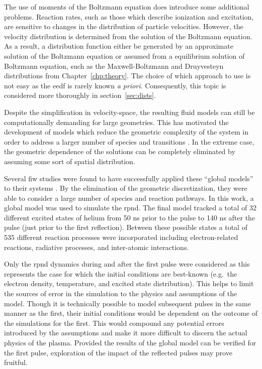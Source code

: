 The use of moments of the Boltzmann equation does introduce some additional
problems. Reaction rates, such as those which describe ionization and
excitation, are sensitive to changes in the distribution of particle velocities.
However, the velocity distribution is determined from the solution of the
Boltzmann equation. As a result, a distribution function either be generated by
an approximate solution of the Boltzmann equation \cite{Hagelaar2005} or assumed
from a equilibrium solution of Boltzmann equation, such as the Maxwell-Boltzmann
and Druyvesteyn distributions from Chapter~\ref{chp:theory}. The choice of which
approach to use is not easy as the \acs{eedf} is rarely known \emph{a priori}.
Consequently, this topic is considered more thoroughly in
section~\ref{sec:dists}.

Despite the simplification in velocity-space, the resulting fluid models can
still be computationally demanding for large geometries. This has motivated the
development of models which reduce the geometric complexity of the system in
order to address a larger number of species and transitions
\cite{Lieberman2005}. In the extreme case, the geometric dependence of the
solutions can be completely eliminated by assuming some sort of spatial
distribution.

Several \acs{fiw} studies were found to have successfully applied these ``global
models'' to their systems \cite{Aleksandrov2007, Popov2011}. By the elimination
of the geometric discretization, they were able to consider a large number of
species and reaction pathways. In this work, a global model was used to simulate
the \acs{rpnd}. The final model tracked a total of 32 different excited states
of helium from 50 ns prior to the pulse to 140 ns after the pulse (just prior to
the first reflection). Between these possible states a total of 535 different
reaction processes were incorporated including electron-related reactions,
radiative processes, and inter-atomic interactions.

Only the \acs{rpnd} dynamics during and after the first pulse were considered as
this represents the case for which the initial conditions are best-known (e.g.\
the electron density, temperature, and excited state distribution). This helps
to limit the sources of error in the simulation to the physics and assumptions
of the model. Though it is technically possible to model subsequent pulses in
the same manner as the first, their initial conditions would be dependent on the
outcome of the simulations for the first. This would compound any potential
errors introduced by the assumptions and make it more difficult to discern the
actual physics of the plasma. Provided the results of the global model can be
verified for the first pulse, exploration of the impact of the reflected pulses
may prove fruitful.

